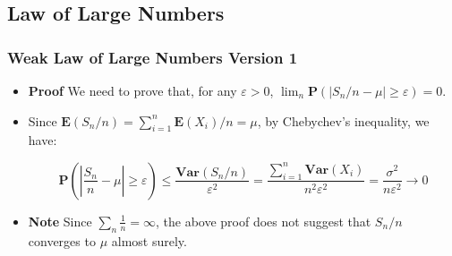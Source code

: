 \documentclass[handout]{beamer}
\newcommand{\BP}{\mathbf{P}}
\newcommand{\BE}{\mathbf{E}}
\newcommand{\BV}{\mathbf{Var}}
\begin{document}
\subsection{Law of Large Numbers }



\frame
{
  \frametitle{Weak Law of Large Numbers Version 1}

   \begin{itemize}
      \begin{Theorem}[WLLN V1] For a sequence of independent random variables $X_1, X_2,\ldots$ with the same mean $\mu$ and finite variance bounded by $\sigma^2$, define $S_n=X_1+X_2+\cdots +X_n$, then $S_n/n$ converges to $\mu$ in probability.
      
   \end{Theorem}
      
      \item<2-> \textbf{Proof} We need to prove that, for any $\varepsilon>0$, $\lim_n \BP(|S_n/n-\mu|\geq \varepsilon)=0$. 
      

      
           \item<3->[-]  Since $\BE(S_n/n)=\sum_{i=1}^n \BE(X_i)/n=\mu$, by Chebychev's inequality, we have:
           
           $$\BP(|\frac{S_n}{n}-\mu|\geq \varepsilon) \leq \frac{\BV(S_n/n)}{\varepsilon^2} =\frac{\sum_{i=1}^n \BV(X_i)}{n^2 \varepsilon^2} = \frac{\sigma^2}{n\varepsilon^2}\rightarrow 0$$
           
     \item<4->\textbf{Note} Since $\sum_n \frac{1}{n}=\infty$, the above proof does not suggest that  $S_n/n$ converges to $\mu$ almost surely.
      
                                      
\end{itemize}
}
\end{document}

